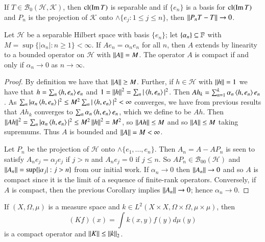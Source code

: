 \begin{cor}
    If $T \in \mathscr{B}_0(\mathscr{H},\mathscr{K})$, then $\text{cl}(\operatorname{Im} T)$ is separable and if $\{e_n\}$ is a basis for $\text{cl}(\operatorname{Im} T)$ and $P_n$ is the projection of $\mathscr{K}$ onto $\land\{e_j:1\leq j\leq n\}$, then $\left|\left| P_nT-T\right|\right|\rightarrow 0$.
\end{cor}

\begin{prop}
    Let $\mathscr{H}$ be a separable Hilbert space with basis $\{e_n\}$; let $\{\alpha_n\}\subseteq \mathbb F$ with $M = \sup\{|\alpha_n|:n\geq 1\} < \infty$. If $Ae_n = \alpha_ne_n$ for all $n$, then $A$ extends by linearity to a bounded operator on $\mathscr{H}$ with $\left|\left| A\right|\right| = M$. The operator $A$ is compact if and only if $\alpha_n\rightarrow 0$ as $n\rightarrow \infty$.
\end{prop}
\begin{proof}
    By definition we have that $\left|\left| A\right|\right| \geq M$. Further, if $h \in \mathscr{H}$ with $\left|\left| h\right|\right| = 1$ we have that $h = \sum_{n}\left\langle h, e_n\right\rangle e_n$ and $1 = \left|\left| h\right|\right|^2 = \sum_n|\left\langle h, e_n\right\rangle|^2$. Then $Ah_k = \sum_{n=1}^k\alpha_n\left\langle h, e_n\right\rangle e_n$. As $\sum_n|\alpha_n\left\langle h, e_n\right\rangle|^2 \leq M^2 \sum_n|\left\langle h, e_n\right\rangle|^2 < \infty$ converges, we have from previous results that $Ah_k$ converges to $\sum_n\alpha_n\left\langle h, e_n\right\rangle e_n$, which we define to be $Ah$. Then $\left|\left| Ah\right|\right|^2 = \sum_n|\alpha_n\left\langle h, e_n\right\rangle|^2 \leq M^2\left|\left| h\right|\right|^2 = M^2$, so $\left|\left| Ah\right|\right| \leq M$ and so $\left|\left| A\right|\right| \leq M$ taking supremums. Thus $A$ is bounded and $\left|\left| A\right|\right| = M < \infty$.

    Let $P_n$ be the projection of $\mathscr{H}$ onto $\land\{e_1,...,e_n\}$. Then $A_n = A-AP_n$ is seen to satisfy $A_ne_j = \alpha_je_j$ if $j > n$ and $A_ne_j = 0$ if $j \leq n$. So $AP_n \in \mathscr{B}_{00}(\mathscr{H})$ and $\left|\left| A_n\right|\right| = \sup\{|\alpha_j|: j > n\}$ from our initial work. If $\alpha_n\rightarrow 0$ then $\left|\left| A_n\right|\right|\rightarrow 0$ and so $A$ is compact since it is the limit of a sequence of finite-rank operators. Conversely, if $A$ is compact, then the previous Corollary implies $\left|\left| A_n\right|\right|\rightarrow 0$; hence $\alpha_n\rightarrow 0$.
\end{proof}

\begin{prop}
    If $(X,\Omega,\mu)$ is a measure space and $k \in L^2(X\times X,\Omega\times \Omega,\mu\times \mu)$, then $$(Kf)(x) = \int k(x,y)f(y)d\mu(y)$$
    is a compact operator and $\left|\left| K\right|\right| \leq \left|\left| k\right|\right|_2$.
\end{prop}

